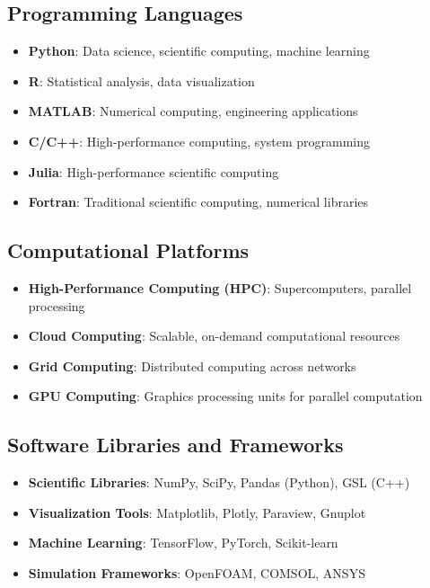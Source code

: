 \subsection{Programming Languages}
\begin{itemize}
  \item \textbf{Python}: Data science, scientific computing, machine learning
  \item \textbf{R}: Statistical analysis, data visualization
  \item \textbf{MATLAB}: Numerical computing, engineering applications
  \item \textbf{C/C++}: High-performance computing, system programming
  \item \textbf{Julia}: High-performance scientific computing
  \item \textbf{Fortran}: Traditional scientific computing, numerical libraries
\end{itemize}

\subsection{Computational Platforms}
\begin{itemize}
  \item \textbf{High-Performance Computing (HPC)}: Supercomputers, parallel processing
  \item \textbf{Cloud Computing}: Scalable, on-demand computational resources
  \item \textbf{Grid Computing}: Distributed computing across networks
  \item \textbf{GPU Computing}: Graphics processing units for parallel computation
\end{itemize}

\subsection{Software Libraries and Frameworks}
\begin{itemize}
  \item \textbf{Scientific Libraries}: NumPy, SciPy, Pandas (Python), GSL (C++)
  \item \textbf{Visualization Tools}: Matplotlib, Plotly, Paraview, Gnuplot
  \item \textbf{Machine Learning}: TensorFlow, PyTorch, Scikit-learn
  \item \textbf{Simulation Frameworks}: OpenFOAM, COMSOL, ANSYS
\end{itemize}

